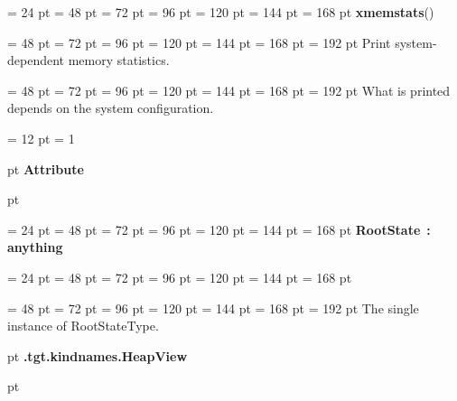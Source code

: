 {{{{\par}
\par}
\par}
{\par \noindent  \leftskip = 24 pt  \leftmargini = 48 pt  \leftmarginii = 72 pt  \leftmarginiii = 96 pt  \leftmarginiv = 120 pt  \leftmarginv = 144 pt  \leftmarginvi = 168 pt {\bf {\large {\bf xmemstats\/}}\/}(){\par \noindent
{\par \noindent  \leftskip = 48 pt  \leftmargini = 72 pt  \leftmarginii = 96 pt  \leftmarginiii = 120 pt  \leftmarginiv = 144 pt  \leftmarginv = 168 pt  \leftmarginvi = 192 pt  Print system-dependent memory statistics.\par}
{\par \noindent  \leftskip = 48 pt  \leftmargini = 72 pt  \leftmarginii = 96 pt  \leftmarginiii = 120 pt  \leftmarginiv = 144 pt  \leftmarginv = 168 pt  \leftmarginvi = 192 pt  What is printed depends on the system configuration.
\par}
\par}
\par}
{\par \pagebreak[3.300000] \noindent \hangindent = 12 pt \hangafter = 1 
{\par \pagebreak[3]  pt \noindent
{\Large {\bf Attribute\/}}\par {} pt
} \noindent
\par}
{\par \noindent  \leftskip = 24 pt  \leftmargini = 48 pt  \leftmarginii = 72 pt  \leftmarginiii = 96 pt  \leftmarginiv = 120 pt  \leftmarginv = 144 pt  \leftmarginvi = 168 pt {\bf {\large {\bf RootState\/}}\/}~{\bf :} {\bf  anything\/}\par}
{\par \noindent  \leftskip = 24 pt  \leftmargini = 48 pt  \leftmarginii = 72 pt  \leftmarginiii = 96 pt  \leftmarginiv = 120 pt  \leftmarginv = 144 pt  \leftmarginvi = 168 pt {\par \noindent
{\par \noindent  \leftskip = 48 pt  \leftmargini = 72 pt  \leftmarginii = 96 pt  \leftmarginiii = 120 pt  \leftmarginiv = 144 pt  \leftmarginv = 168 pt  \leftmarginvi = 192 pt  The single instance of RootStateType.
\par}
\par}
\par}
\par}
{\par \pagebreak[3]  pt \noindent
{\LARGE {\bf .tgt.kindnames.HeapView\/}}\par {} pt
} \noindent

